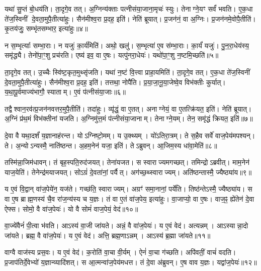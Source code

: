 यथा॑ सु॒प्तं बो॒धय॑ति।
ता॒दृगे॒व तत्।
अ॒ग्निन्य॑क्ताः पत्नीसंया॒जाना॒मृचः॑ स्युः।
तेनाग्ने॒यꣳ सर्वं॑ भवति।
ए॒क॒धा ते॑ज॒स्विनीं दे॒वता॒मुपै॒तीत्या॑हुः।
सैन॑मीश्व॒रा प्र॒दह॒ इति॑।
नेति॑ ब्रूयात्।
प्र॒जन॑नं॒ वा अ॒ग्निः।
प्र॒जन॑नमे॒वोपै॒तीति॑।
कृ॒तय॑जुः॒ सम्भृ॑तसम्भार॒ इत्या॑हुः॥४॥

न स॒म्भृत्याः᳚ सम्भा॒राः।
न यजुः॑ का॒र्य॑मिति॑।
अथो॒ खलु॑।
स॒म्भृत्या॑ ए॒व स॑म्भा॒राः।
का॒र्यं॑ यजुः॑।
पु॒न॒रा॒धेय॑स्य॒ समृ॑द्ध्यै।
तेनो॑पा॒ꣳ॒शु प्रच॑रति।
एष्य॑ इव॒ वा ए॒षः।
यत्पु॑नरा॒धेयः॑।
यथो॑पा॒ꣳ॒शु न॒ष्टमि॒च्छति॑॥५॥

ता॒दृगे॒व तत्।
उ॒च्चैः स्वि॑ष्ट॒कृत॒मुथ्सृ॑जति।
यथा॑ न॒ष्टं वि॒त्त्वा प्राहा॒यमिति॑।
ता॒दृगे॒व तत्।
ए॒क॒धा ते॑ज॒स्विनीं दे॒वता॒मुपै॒तीत्या॑हुः।
सैन॑मीश्व॒रा प्र॒दह॒ इति॑।
तत्तथा॒ नोपै॑ति।
प्र॒या॒जा॒नू॒या॒जेष्वे॒व विभ॑क्तीः कुर्यात्।
य॒था॒पू॒र्वमाज्य॑भागौ॒ स्याताम्।
ए॒वं प॑त्नीसंया॒जाः॥६॥

तद्वैश्वान॒रव॑त्प्र॒जन॑नवत्तर॒मुपै॒तीति॑।
तदा॑हुः।
व्यृ॑द्धं॒ वा ए॒तत्।
अनाग्नेयं॒ वा ए॒तत्क्रि॑यत॒ इति॑।
नेति॑ ब्रूयात्।
अ॒ग्निं प्र॑थ॒मं विभ॑क्तीनां यजति।
अ॒ग्निमु॑त्त॒मं प॑त्नीसंया॒जानाम्।
तेनाग्ने॒यम्।
तेन॒ समृ॑द्धं क्रियत॒ इति॑॥७॥\anuvakamend[अ॒रु॒न्ध॒तै॒व तद्भ॑वति॒ सम्भृ॑तसम्भार॒ इत्या॑हुरि॒च्छति॑ पत्नीसंया॒जा नव॑ च]

दे॒वा वै यथा॒दर्\mbox{}शं॑ य॒ज्ञानाह॑रन्त।
योऽग्निष्टो॒मम्।
य उ॒क्थ्यम्।
यो॑ऽतिरा॒त्रम्।
ते स॒हैव सर्वे॑ वाज॒पेय॑मपश्यन्।
ते।
अ॒न्यो\-ऽन्यस्मै॒ नाति॑ष्ठन्त।
अ॒हम॒नेन॑ यजा॒ इति॑।
तेऽब्रुवन्।
आ॒जिम॒स्य धा॑वा॒मेति॑॥८॥

तस्मि॑न्ना॒जिम॑धावन्।
तं बृह॒स्पति॒रुद॑जयत्।
तेना॑यजत।
स स्वाराज्यमगच्छत्।
तमिन्द्रो\-ऽब्रवीत्।
माम॒नेन॑ याज॒येति॑।
तेनेन्द्र॑मयाजयत्।
सोऽग्रं॑ दे॒वता॑नां॒ पर्यैत्।
अग॑च्छ॒थ्स्वाराज्यम्।
अति॑ष्ठन्तास्मै॒ ज्यैष्ठ्या॑य॥९॥

य ए॒वं वि॒द्वान् वा॑ज॒पेये॑न॒ यज॑ते।
गच्छ॑ति॒ स्वाराज्यम्।
अग्रꣳ॑ समा॒नानां॒ पर्ये॑ति।
तिष्ठ॑न्ते\-ऽस्मै॒ ज्यैष्ठ्या॑य।
स वा ए॒ष ब्राह्म॒णस्य॑ चै॒व रा॑ज॒न्य॑स्य च य॒ज्ञः।
तं वा ए॒तं वा॑ज॒पेय॒ इत्या॑हुः।
वा॒जाप्यो॒ वा ए॒षः।
वाज॒ꣴ॒ ह्ये॑तेन॑ दे॒वा ऐफ्स\sn{}।
सोमो॒ वै वा॑ज॒पेयः॑।
यो वै सोमं॑ वाज॒पेयं॒ वेद॑॥१०॥

वा॒ज्ये॑वैनं॑ पी॒त्वा भ॑वति।
आऽस्य॑ वा॒जी जा॑यते।
अन्नं॒ वै वा॑ज॒पेयः॑।
य ए॒वं वेद॑।
अत्यन्नम्।
आऽस्यान्ना॒दो जा॑यते।
ब्रह्म॒ वै वा॑ज॒पेयः॑।
य ए॒वं वेद॑।
अत्ति॒ ब्रह्म॒णा\-ऽन्नम्।
आऽस्य॑ ब्र॒ह्मा जा॑यते॥११॥

वाग्वै वाज॑स्य प्रस॒वः।
य ए॒वं वेद॑।
क॒रोति॑ वा॒चा वी॒र्यम्।
ऐनं॑ वा॒चा ग॑च्छति।
अपि॑वतीं॒ वाचं॑ वदति।
प्र॒जाप॑तिर्दे॒वेभ्यो॑ य॒ज्ञान्व्यादि॑शत्।
स आ॒त्मन्वा॑ज॒पेय॑मधत्त।
तं दे॒वा अ॑ब्रुवन्।
ए॒ष वाव य॒ज्ञः।
यद्वा॑ज॒पेयः॑॥१२॥

